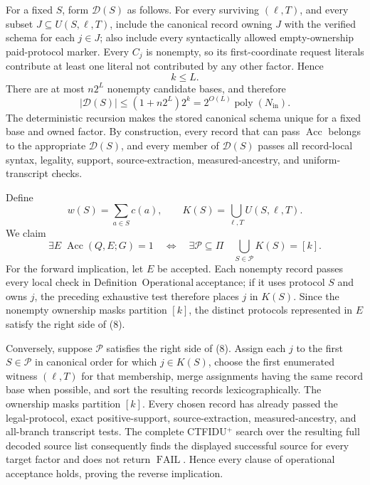 For a fixed \(S\), form \(\mathcal D(S)\) as follows.  For every surviving \((\ell,T)\), and every subset \(J\subseteq U(S,\ell,T)\), include the canonical record owning \(J\) with the verified schema for each \(j\in J\); also include every syntactically allowed empty-ownership paid-protocol marker.  Every \(C_j\) is nonempty, so its first-coordinate request literals contribute at least one literal not contributed by any other factor.  Hence
\[
  k\leq L. \tag{5}
\]
There are at most \(n2^L\) nonempty candidate bases, and therefore
\[
  |\mathcal D(S)|\leq (1+n2^L)2^k
  =2^{O(L)}\operatorname{poly}(N_{\mathrm{in}}). \tag{6}
\]
The deterministic recursion makes the stored canonical schema unique for a fixed base and owned factor.  By construction, every record that can pass \(\operatorname{Acc}\) belongs to the appropriate \(\mathcal D(S)\), and every member of \(\mathcal D(S)\) passes all record-local syntax, legality, support, source-extraction, measured-ancestry, and uniform-transcript checks.

Define
\[
  w(S)=\sum_{a\in S}c(a),
  \qquad
  K(S)=\bigcup_{\ell,T}U(S,\ell,T). \tag{7}
\]
We claim
\[
  \exists E\;\operatorname{Acc}(Q,E;G)=1
  \quad\Longleftrightarrow\quad
  \exists\mathcal P\subseteq\Pi\quad
  \bigcup_{S\in\mathcal P}K(S)=[k]. \tag{8}
\]
For the forward implication, let \(E\) be accepted.  Each nonempty record passes every local check in Definition~\(\mathrm{Operational\ acceptance}\); if it uses protocol \(S\) and owns \(j\), the preceding exhaustive test therefore places \(j\) in \(K(S)\).  Since the nonempty ownership masks partition \([k]\), the distinct protocols represented in \(E\) satisfy the right side of (8).

Conversely, suppose \(\mathcal P\) satisfies the right side of (8).  Assign each \(j\) to the first \(S\in\mathcal P\) in canonical order for which \(j\in K(S)\), choose the first enumerated witness \((\ell,T)\) for that membership, merge assignments having the same record base when possible, and sort the resulting records lexicographically.  The ownership masks partition \([k]\).  Every chosen record has already passed the legal-protocol, exact positive-support, source-extraction, measured-ancestry, and all-branch transcript tests.  The complete CTFIDU\({}^{+}\) search over the resulting full decoded source list consequently finds the displayed successful source for every target factor and does not return \(\operatorname{FAIL}\).  Hence every clause of operational acceptance holds, proving the reverse implication.

